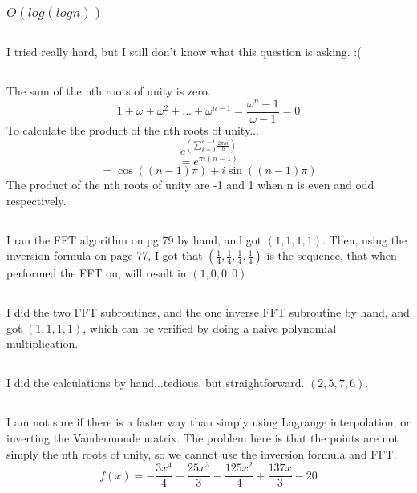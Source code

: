 \documentclass{article}
\begin{document}
\subsubsection{$O(log(logn))$}
\subsection{}I tried really hard, but I still don't know what this question is asking. :(
\subsection{}
The sum of the nth roots of unity is zero.
$$1 + \omega + \omega^2 + ... + \omega^{n-1} = \frac{\omega^n-1}{\omega-1} = 0$$
To calculate the product of the nth roots of unity...
$$e^{(\sum_{k=0}^{n-1}\frac{2\pi ki}{n})}$$
$$=e^{\pi i(n-1)}$$
$$=\cos((n-1)\pi)+i\sin((n-1)\pi)$$
The product of the nth roots of unity are -1 and 1 when n is even and odd respectively. 
\subsection{}I ran the FFT algorithm on pg 79 by hand, and got $(1,1,1,1)$. Then, using the inversion formula on page 77, I got that $(\frac{1}{4}, \frac{1}{4}, \frac{1}{4}, \frac{1}{4})$ is the sequence, that when performed the FFT on, will result in $(1,0,0,0)$.
\subsection{}
\subsubsection{}I did the two FFT subroutines, and the one inverse FFT subroutine by hand, and got $(1,1,1,1)$, which can be verified by doing a naive polynomial multiplication.
\subsection{}I did the calculations by hand...tedious, but straightforward. $(2,5,7,6)$.
\subsection{}I am not sure if there is a faster way than simply using Lagrange interpolation, or inverting the Vandermonde matrix. The problem here is that the points are not simply the nth roots of unity, so we cannot use the inversion formula and FFT. 
$$ f(x) = -\frac{3 x^4}{4}+\frac{25 x^3}{3}-\frac{125 x^2}{4}+\frac{137 x}{3}-20 $$
\end{document}
